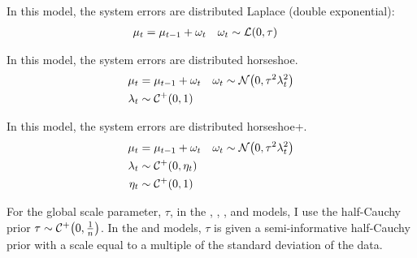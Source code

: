 \begin{description}[font = \normalfont\ModelII]
\item[Laplace] In this model, the system errors are distributed Laplace (double exponential):
  \begin{equation}
    \label{dlm:eq:22}
    \begin{aligned}[t]
      \mu_{t} &= \mu_{t - 1} + \omega_{t} & \omega_{t} & \sim \mathcal{L}\mathopen{}\left(0, \tau\right)\mathclose{}
    \end{aligned}
  \end{equation}
\item[Horseshoe] In this model, the system errors are distributed horseshoe.
  \begin{equation}
    \label{dlm:eq:19}
    \begin{aligned}[t]
      \mu_{t} &= \mu_{t - 1} + \omega_{t} & \omega_{t} & \sim \mathcal{N}\mathopen{}\left(0, \tau^{2} \lambda^{2}_{t}\right)\mathclose{} \\
      \lambda_{t} &\sim \mathcal{C^+}\mathopen{}\left(0, 1\right)\mathclose{}
    \end{aligned}
  \end{equation}
\item[Horseshoe+] In this model, the system errors are distributed horseshoe+.
  \begin{equation}
    \label{dlm:eq:23}
    \begin{aligned}[t]
      \mu_{t} &= \mu_{t - 1} + \omega_{t} & \omega_{t} & \sim \mathcal{N}\mathopen{}\left(0, \tau^{2} \lambda^{2}_{t}\right)\mathclose{} \\
      \lambda_{t} &\sim \mathcal{C^+}\mathopen{}\left(0, \eta_{t}\right)\mathclose{} \\
      \eta_{t} &\sim \mathcal{C^+}\mathopen{}\left(0, 1\right)\mathclose{}
    \end{aligned}
  \end{equation}
\end{description}
For the global scale parameter, $\tau$, in the , , , and  models, I use the half-Cauchy prior $\tau \sim \mathcal{C^+}\mathopen{}\left(0, \frac{1}{n}\right)\mathclose{}$.
In the  and  models, $\tau$ is given a semi-informative half-Cauchy prior with a scale equal to a multiple of the standard deviation of the data.


